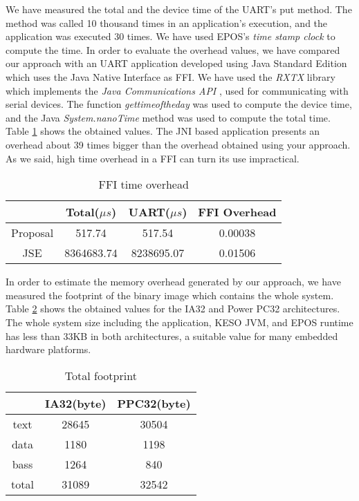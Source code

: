 \documentclass[12pt]{article} %
\begin{document}
We have measured the total and the device time of the UART's put method. The method was called 10 thousand times in an application's execution, and the application was executed 30 times. We have used EPOS's \emph{time stamp clock} to compute the time. In order to evaluate the overhead values, we have compared our approach with an UART application developed using Java Standard Edition which uses the Java Native Interface as FFI. We have used the \emph{RXTX} \cite{site:RXTX} library which implements the \emph{Java Communications API} \cite{site:JavaCommAPI}, used for communicating with serial devices. The function \emph{gettimeoftheday} was used to compute the device time, and the Java \emph{System.nanoTime} method was used to compute the total time. Table \ref{tab:time_overhead} shows the obtained values. %
The JNI based application presents an overhead about 39 times bigger than the overhead obtained using your approach. As we said, high time overhead in a FFI can turn its use impractical.

\begin{table}[t]
\begin{center}
\begin{tabular}{|c|c|c|c|}
\hline
\textbf{} & \textbf{Total($\mu$$s$)} & \textbf{UART($\mu$$s$)} & \textbf{FFI Overhead}\\
\hline
Proposal & 517.74 & 517.54 & 0.00038 \\
\hline
JSE & 8364683.74 & 8238695.07 & 0.01506 \\
\hline
\end{tabular}
\caption{FFI time overhead}
\label{tab:time_overhead}
\end{center}
\end{table}

In order to estimate the memory overhead generated by our approach, we have measured the footprint of the binary image which contains the whole system. Table \ref{tab:space_overhead} shows the obtained values for the IA32 and Power PC32 architectures. The whole system size including the application, KESO JVM, and EPOS runtime has less than 33KB in both architectures, a suitable value for many embedded hardware platforms.

\begin{table}[t]
\begin{center}
\begin{tabular}{|c|c|c|}
\hline
\textbf{} & \textbf{IA32(byte)} & \textbf{PPC32(byte)} \\
\hline
text & 28645 & 30504 \\
\hline
data & 1180 & 1198 \\
\hline
bass & 1264 & 840 \\
\hline
total & 31089 & 32542 \\
\hline
\end{tabular}
\caption{Total footprint}
\label{tab:space_overhead}
\end{center}
\end{table}
\end{document}
